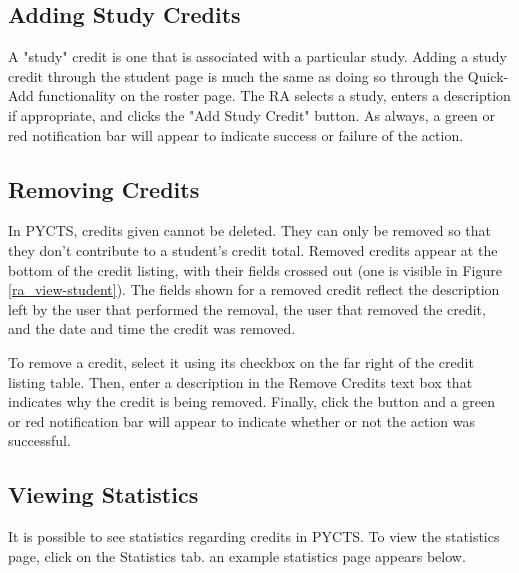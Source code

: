 \documentclass[letterpaper,titlepage]{article}
\begin{document}
\subsection{Adding Study Credits}
A "study" credit is one that is associated with a particular study. Adding a study credit through the student page is much the same as doing so through the Quick-Add functionality on the roster page. The RA selects a study, enters a description if appropriate, and clicks the "Add Study Credit" button. As always, a green or red notification bar will appear to indicate success or failure of the action.

\subsection{Removing Credits}
In PYCTS, credits given cannot be deleted. They can only be removed so that they don't contribute to a student's credit total. Removed credits appear at the bottom of the credit listing, with their fields crossed out (one is visible in Figure \ref{ra_view-student}). The fields shown for a removed credit reflect the description left by the user that performed the removal, the user that removed the credit, and the date and time the credit was removed.

To remove a credit, select it using its checkbox on the far right of the credit listing table. Then, enter a description in the Remove Credits text box that indicates why the credit is being removed. Finally, click the button and a green or red notification bar will appear to indicate whether or not the action was successful.

\newpage

\subsection{Viewing Statistics}
It is possible to see statistics regarding credits in PYCTS. To view the statistics page, click on the Statistics tab. an example statistics page appears below.
\end{document}
